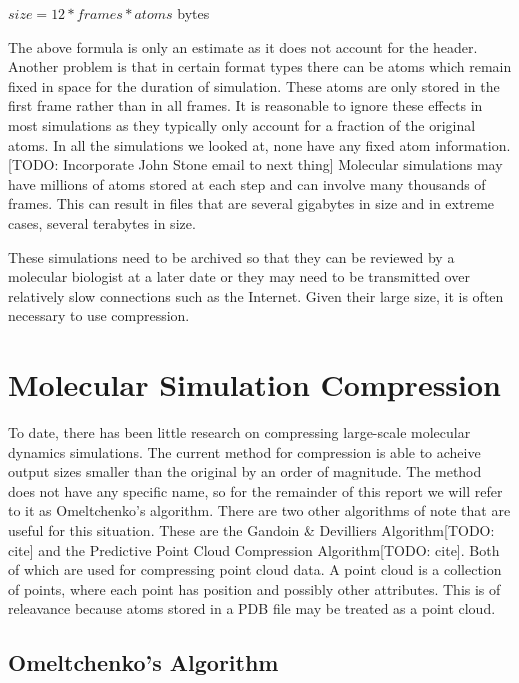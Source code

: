 \documentclass[a4paper,11pt]{report}
\begin{document}
\begin{center} $size = 12*frames*atoms$ bytes\end{center}

The above formula is only an estimate as it does not account for the header. Another problem is that in certain format types there can be atoms which remain fixed in space for the duration of simulation. These atoms are only stored in the first frame rather than in all frames. It is reasonable to ignore these effects in most simulations as they typically only account for a fraction of the original atoms. In all the simulations we looked at, none have any fixed atom information. [TODO: Incorporate John Stone email to next thing] Molecular simulations may have millions of atoms stored at each step and can involve many thousands of frames. This can result in files that are several gigabytes in size and in extreme cases, several terabytes in size.

These simulations need to be archived so that they can be reviewed by a molecular biologist at a later date or   they may need to be transmitted over relatively slow connections such as the Internet. Given their large size, it is often necessary to use compression.

\section{Molecular Simulation Compression}
\label{back_msc}
To date, there has been little research on compressing large-scale molecular dynamics simulations. The current method\cite{RefWorks:3} for compression is able to acheive output sizes smaller than the original by an order of magnitude. The method does not have any specific name, so for the remainder of this report we will refer to it as Omeltchenko's algorithm. There are two other algorithms of note that are useful for this situation. These are the Gandoin \& Devilliers Algorithm[TODO: cite] and the Predictive Point Cloud Compression Algorithm[TODO: cite]. Both of which are used for compressing point cloud data. A point cloud is a collection of points, where each point has position and possibly other attributes. This is of releavance because atoms stored in a PDB file may be treated as a point cloud.

\subsection{Omeltchenko's Algorithm}
\label{bgomel}
\end{document}
